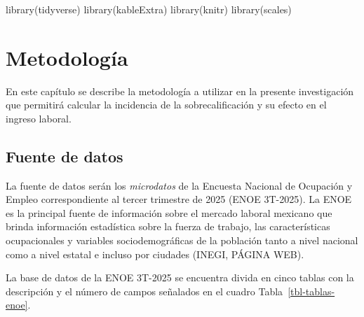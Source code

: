 \documentclass[
  spanish,
  letterpaper,
  DIV=11,
  numbers=noendperiod]{scrartcl}
\author{}
\date{}
\newenvironment{Shaded}{\begin{snugshade}}{\end{snugshade}}
\newcommand{\FunctionTok}[1]{\textcolor[rgb]{0.28,0.35,0.67}{#1}}
\newcommand{\NormalTok}[1]{\textcolor[rgb]{0.00,0.23,0.31}{#1}}
\begin{document}
\begin{Shaded}
\begin{Highlighting}[]
\FunctionTok{library}\NormalTok{(tidyverse)}
\FunctionTok{library}\NormalTok{(kableExtra)}
\FunctionTok{library}\NormalTok{(knitr)}
\FunctionTok{library}\NormalTok{(scales)}
\end{Highlighting}
\end{Shaded}

\section{Metodología}\label{metodologuxeda}

En este capítulo se describe la metodología a utilizar en la presente
investigación que permitirá calcular la incidencia de la
sobrecalificación y su efecto en el ingreso laboral.

\subsection{Fuente de datos}\label{fuente-de-datos}

La fuente de datos serán los \emph{microdatos} de la Encuesta Nacional
de Ocupación y Empleo correspondiente al tercer trimestre de 2025 (ENOE
3T-2025). La ENOE es la principal fuente de información sobre el mercado
laboral mexicano que brinda información estadística sobre la fuerza de
trabajo, las características ocupacionales y variables sociodemográficas
de la población tanto a nivel nacional como a nivel estatal e incluso
por ciudades (INEGI, PÁGINA WEB).

La base de datos de la ENOE 3T-2025 se encuentra divida en cinco tablas
con la descripción y el número de campos señalados en el cuadro
Tabla~\ref{tbl-tablas-enoe}.
\end{document}
